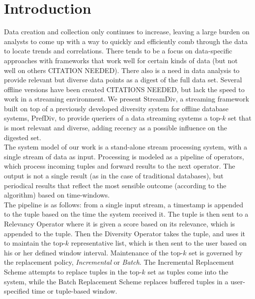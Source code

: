 \section{Introduction}

Data creation and collection only continues to increase, leaving a large burden on analysts to come up with a way to quickly and efficiently comb through the data to locate trends and correlations.  There tends to be a focus on data-specific approaches with frameworks that work well for certain kinds of data (but not well on others CITATION NEEDED).  There also is a need in data analysis to provide relevant but diverse data points as a digest of the full data set.  Several offline versions have been created \cite{Ge:2015:PD:2795218.2795224} CITATIONS NEEDED,  but lack the speed to work in a streaming environment.  We present StreamDiv, a streaming framework built on top of a previously developed diversity system for offline database systems, PrefDiv\cite{Ge:2015:PD:2795218.2795224}, to provide queriers of a data streaming systems a top-$k$ set that is most relevant and diverse, adding recency as a possible influence on the digested set.\\
\indent The system model of our work is a stand-alone stream processing system, with a single stream of data as input. Processing is modeled as a pipeline of operators, which process incoming tuples and forward results to the next operator.  The output is not a single result (as in the case of traditional databases), but periodical results that reflect the most sensible outcome (according to the algorithm) based on time-windows.\\
\indent The pipeline is as follows: from a single input stream, a timestamp is appended to the tuple based on the time the system received it.  The tuple is then sent to a Relevancy Operator where it is given a score based on its relevance, which is appended to the tuple.  Then the Diversity Operator takes the tuple, and uses it to maintain the top-$k$ representative list, which is then sent to the user based on his or her defined window interval.  Maintenance of the top-$k$ set is governed by the replacement policy, \emph{Incremental} or \emph{Batch}.  The Incremental Replacement Scheme attempts to replace tuples in the top-$k$ set as tuples come into the system, while the Batch Replacement Scheme replaces buffered tuples in a user-specified time or tuple-based window.
